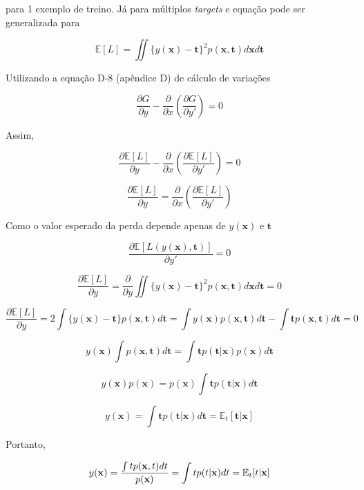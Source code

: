 \documentclass{article}
\begin{document}
  para 1 exemplo de treino. Já para múltiplos \textit{targets} e equação pode ser generalizada para

   \begin{equation}
  	\mathbb{E}[L]=\iint\{y(\mathbf{x})-\mathbf{t}\}^{2}p(\mathbf{x},\mathbf{t})d\mathbf{x}d\mathbf{t}\end{equation}

  Utilizando a equação D-8 (apêndice D) de cálculo de variações
  
  \begin{equation}
           \frac{\partial G}{\partial y} -   \frac{\partial }{\partial x} \left(\frac{\partial G}{\partial y'}\right) = 0
  \end{equation} 
  
  Assim,
  
  \[
  \frac{\partial 	\mathbb{E}[L]}{\partial y} -   \frac{\partial }{\partial x} \left(\frac{\partial \mathbb{E}[L]}{\partial y'}\right) = 0
  \]
  
  \[
  \frac{\partial 	\mathbb{E}[L]}{\partial y} =   \frac{\partial }{\partial x} \left(\frac{\partial \mathbb{E}[L]}{\partial y'}\right) 
  \]
  
  Como o valor esperado da perda depende apenas de $y(\mathbf{x})$ e $\mathbf{t}$
  
  \[
 \frac{\partial \mathbb{E}[L (y(\mathbf{x}),\mathbf{t})]}{\partial y'} = 0
  \]
  
   \[
  \frac{\partial \mathbb{E}[L]}{\partial y} = \frac{\partial }{\partial y} \iint\{y(\mathbf{x})-\mathbf{t}\}^{2}p(\mathbf{x},\mathbf{t})d\mathbf{x}d\mathbf{t} =0
  \]
  
  \[
  \frac{\partial \mathbb{E}[L]}{\partial y} = 2\int\{y(\mathbf{x})-\mathbf{t}\}p(\mathbf{x},\mathbf{t})d\mathbf{t} = \int y(\mathbf{x})p(\mathbf{x},\mathbf{t})d\mathbf{t}-\int\mathbf{t}p(\mathbf{x},\mathbf{t})d\mathbf{t}=0
  \]
  
  \[ 
  y(\mathbf{x}) \int p(\mathbf{x},\mathbf{t})d\mathbf{t} = \int\mathbf{t}p(\mathbf{t}|\mathbf{x}) p(\mathbf{x})d\mathbf{t}
  \]
  
  \[
   y(\mathbf{x}) p(\mathbf{x}) =  p(\mathbf{x})\int\mathbf{t}p(\mathbf{t}|\mathbf{x}) d\mathbf{t}
  \]
  
  \[
  y(\mathbf{x}) =  \int\mathbf{t}p(\mathbf{t}|\mathbf{x}) d\mathbf{t} = \mathbb{E}_{t}[\mathbf{t}|\mathbf{x}]
  \]
  
  Portanto,
  
  \begin{equation}
  	y(\mathbf{x})=\frac{\intop tp(\mathbf{x},t)dt}{p(\mathbf{x})}=\int tp(t|\mathbf{x})dt=\mathbb{E}_{t}[t|\mathbf{x}]                          
  \end{equation} 
\end{document}
